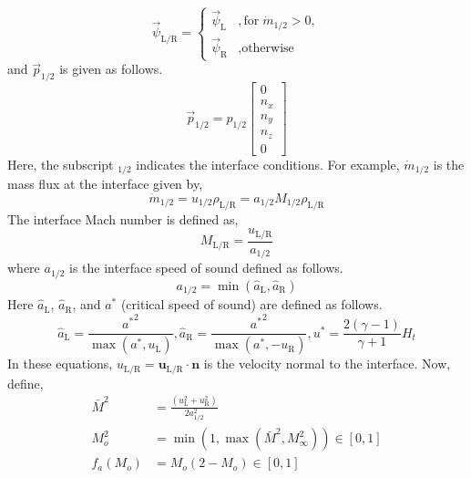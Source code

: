 \begin{equation}
  \vec{\psi}_{\text{L/R}} = \begin{cases}
    \vec{\psi}_{\text{L}} & , \text{for} \; \dot{m}_{\text{1/2}} > 0, \\
    \vec{\psi}_{\text{R}} & , \text{otherwise}
  \end{cases}
\end{equation}
and $\vec{p}_{\text{1/2}}$ is given as follows.
\begin{equation}
\vec{p}_{\text{1/2}} = p_{{\text{1/2}}} \begin{bmatrix}
0 \\ n_x \\ n_y \\ n_z \\ 0
\end{bmatrix}
\end{equation}
Here, the subscript $_{\text{1/2}}$ indicates the interface
conditions. For example, $\dot{m}_{\text{1/2}}$ is the mass flux at
the interface given by,
\begin{equation}
\dot{m}_{\text{1/2}} = u_{\text{1/2}} \rho_{\text{L/R}} = a_{\text{1/2}} M_{\text{1/2}} \rho_{\text{L/R}}
\end{equation}
The interface Mach number is defined as,
\begin{equation}
M_{\text{L/R}} = \frac{u_{\text{L/R}}}{a_{\text{1/2}}}
\end{equation}
where $a_{\text{1/2}}$ is the interface speed of sound defined as
follows.
\begin{equation}
a_{\text{1/2}} = \min(\hat{a}_{\text{L}}, \hat{a}_{\text{R}})
\end{equation}
Here $\hat{a}_{\text{L}}$, $\hat{a}_{\text{R}}$, and $a^*$ (critical
speed of sound) are defined as follows.
\begin{equation}
\hat{a}_{\text{L}} = \frac{{a^{*}}^2}{\max(a^*,  u_{\text{L}})},
\hat{a}_{\text{R}} = \frac{{a^{*}}^2}{\max(a^*, -u_{\text{R}})},
u^{*} = \frac{2(\gamma-1)}{\gamma+1} H_t
\end{equation}
In these equations, $u_{\text{L/R}} = \mathbf{u}_{\text{L/R}} \cdot
\mathbf{n}$ is the velocity normal to the interface. Now, define,
\begin{align}
  \bar{M}^2 &= \frac{(u_{\text{L}}^{2} + u_{\text{R}}^{2})}{2 a_{1/2}^2} \\
  M_{o}^2 &= \min(1, \max(\bar{M}^2, M_{\infty}^2)) \in [0, 1] \\
  f_{a}(M_{o}) &= M_{o}(2 - M_{o}) \in [0, 1]
\end{align}
